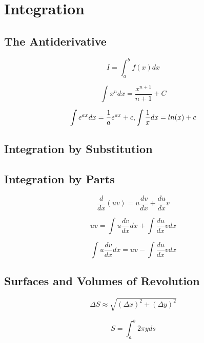 \documentclass[]{article}
\begin{document}
\section{Integration}
\subsection{The Antiderivative}

\begin{equation*}
    I = \int_{a}^{b} f(x)dx
\end{equation*}

\begin{equation*}
    \int x^{n}dx = \frac{x^{n+1}}{n+1} + C
\end{equation*}

\[\int e^{ax}dx = \frac{1}{a}e^{ax} + c, \space \int \frac{1}{x}dx = ln(x) + c\]

\subsection{Integration by Substitution}
\subsection{Integration by Parts}

\begin{equation*}
    \frac{d}{dx}(uv) = u \frac{dv}{dx} + \frac{du}{dx} v
\end{equation*}

\begin{equation*}
    uv = \int u \frac{dv}{dx} dx + \int \frac{du}{dx}vdx
\end{equation*}
    
\begin{equation*}
    \int u \frac{dv}{dx} dx = uv - \int \frac{du}{dx}vdx
\end{equation*}

\subsection{Surfaces and Volumes of Revolution}

\begin{equation*}
    \Delta S \approx \sqrt{(\Delta x)^{2} + (\Delta y)^{2}}
\end{equation*}

\begin{equation*}
    S = \int_{a}^{b} 2 \pi y ds
\end{equation*}
\end{document}
